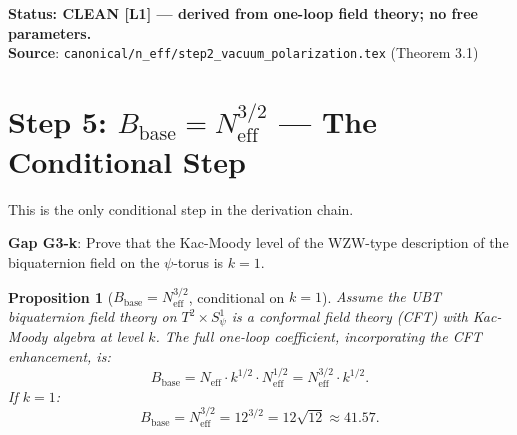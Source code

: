 \documentclass[12pt,a4paper]{article}
\newtheorem{proposition}[theorem]{Proposition}
\theoremstyle{definition}
\theoremstyle{remark}
\begin{document}
\begin{resultbox}
\textbf{Status: CLEAN [L1] — derived from one-loop field theory; no free parameters.}\\
\textbf{Source}: \texttt{canonical/n\_eff/step2\_vacuum\_polarization.tex} (Theorem 3.1)
\end{resultbox}

\section{Step 5: $B_{\mathrm{base}} = N_{\mathrm{eff}}^{3/2}$ — The Conditional Step}
\label{sec:bc:Bbase}

This is the only conditional step in the derivation chain.

\begin{gapbox}
\textbf{Gap G3-k}: Prove that the Kac-Moody level of the WZW-type description
of the biquaternion field on the $\psi$-torus is $k = 1$.
\end{gapbox}

\begin{proposition}[$B_{\mathrm{base}} = N_{\mathrm{eff}}^{3/2}$, conditional on $k = 1$]
\label{prop:bc:Bbase}
Assume the UBT biquaternion field theory on $T^2 \times S^1_\psi$ is a
conformal field theory (CFT) with Kac-Moody algebra at level $k$.  The
full one-loop coefficient, incorporating the CFT enhancement, is:
\begin{equation}
  B_{\mathrm{base}} = N_{\mathrm{eff}} \cdot k^{1/2} \cdot N_{\mathrm{eff}}^{1/2}
  = N_{\mathrm{eff}}^{3/2} \cdot k^{1/2}.
  \label{eq:bc:Bbase_formula}
\end{equation}
If $k = 1$:
\begin{equation}
  B_{\mathrm{base}} = N_{\mathrm{eff}}^{3/2} = 12^{3/2} = 12\sqrt{12} \approx 41.57.
  \label{eq:bc:Bbase_k1}
\end{equation}
\end{proposition}
\end{document}
